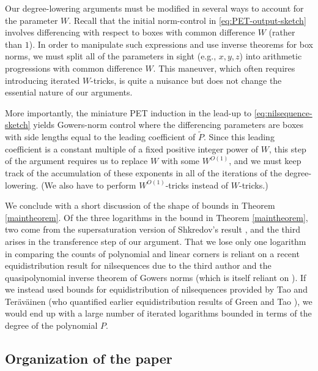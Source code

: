 \documentclass[11pt]{amsart}
\theoremstyle{definition}
\begin{document}
Our degree-lowering arguments must be modified in several ways to account for the parameter $W$.  Recall that the initial norm-control in \eqref{eq:PET-output-sketch} involves differencing with respect to boxes with common difference $W$ (rather than $1$).  In order to manipulate such expressions and use inverse theorems for box norms, we must split all of the parameters in sight (e.g., $x,y,z$) into arithmetic progressions with common difference $W$.  This maneuver, which often requires introducing iterated $W$-tricks, is quite a nuisance but does not change the essential nature of our arguments.

More importantly, the miniature PET induction in the lead-up to \eqref{eq:nilsequence-sketch} yields  Gowers-norm control where the differencing parameters are boxes with side lengths equal to the leading coefficient of $\widetilde P$.  Since this leading coefficient is a constant multiple of a fixed positive integer power of $W$, this step of the argument requires us to replace $W$ with some $W^{O(1)}$, and we must keep track of the accumulation of these exponents in all of the iterations of the degree-lowering.  (We also have to perform $W^{O(1)}$-tricks instead of $W$-tricks.)  

We conclude with a short discussion of the shape of bounds in Theorem \ref{maintheorem}. Of the three logarithms in the bound in Theorem \ref{maintheorem}, two come from the supersaturation version of Shkredov's result \cite{Sh06a, Sh06b}, and the third arises in the transference step of our argument. That we lose only one logarithm in comparing the counts of polynomial and linear corners is reliant on a recent equidistribution result for nilsequences due to the third author \cite{Leng23b} {and the quasipolynomial inverse theorem of Gowers norms \cite{LSS24} (which is itself reliant on \cite{Leng23b})}. If we instead used bounds for equidistribution of nilsequences provided by Tao and Ter\"av\"ainen \cite{TT21} (who quantified earlier equidistribution results of Green and Tao \cite{GT12}), we would end up with a large number of iterated logarithms bounded in terms of the degree of the polynomial $P$.




\subsection{Organization of the paper}
\end{document}
